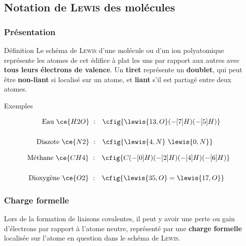 \documentclass[../main/main.tex]{subfiles}
\begin{document}
\subsection{Notation de \textsc{Lewis} des molécules}
\subsubsection{Présentation}

\begin{tdefi}{Définition}
    Le schéma de \textsc{Lewis} d'une molécule ou d'un ion polyatomique
    représente les atomes de cet édifice à plat les uns par rapport aux autres
    avec \textbf{tous leurs électrons de valence}. Un \textbf{tiret} représente
    un \textbf{doublet}, qui peut être \textbf{non-liant} si localisé sur un
    atome, et \textbf{liant} s'il est partagé entre deux atomes.
\end{tdefi}

\begin{rexem}{Exemples}
    \begin{minipage}{0.48\linewidth}
        \begin{align*}
            \text{Eau~}\ce{H2O}~:
            &\quad
            \cfig{\lewis{13,O}
                (-[7]H)
                (-[5]H)
            }
            \\[.5cm]
            \text{Diazote~}\ce{N2}~:
            &\quad
            \cfig{\lewis{4,N}~\lewis{0,N}}
        \end{align*}
    \end{minipage}
    \hfill
    \begin{minipage}{0.48\linewidth}
        \begin{align*}
            \text{Méthane~}\ce{CH4}~:
            &\quad
            \cfig{C
                (-[0]H)
                (-[2]H)
                (-[4]H)
                (-[6]H)
            }
            \\[.5cm]
            \text{Dioxygène~}\ce{O2}~:
            &\quad
            \cfig{\lewis{35,O}=\lewis{17,O}}
        \end{align*}
    \end{minipage}
    
\end{rexem}

\subsubsection{Charge formelle}
Lors de la formation de liaisons covalentes, il peut y avoir une perte ou gain
d'électrons par rapport à l'atome neutre, représenté par une \textbf{charge
formelle} localisée sur l'atome en question dans le schéma de \textsc{Lewis}.
\end{document}

